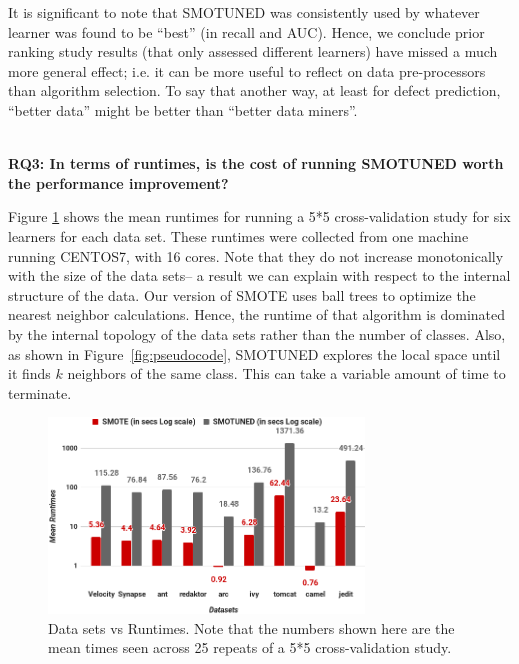 \documentclass[sigconf]{acmart}
\theoremstyle{break}
\newcommand{\sma}{{\sc SMOTE}}
\newcommand{\smb}{{\sc SMOTUNED}}
\begin{document}
It is significant to note that
  {\smb} was  consistently  used  by  whatever  learner  was  found  to  be ``best'' (in recall and AUC). 
Hence, we conclude   prior ranking study results (that only assessed different learners) have missed a much more general effect; i.e.  
it can be more useful to reflect on data pre-processors than algorithm selection.
To say that another way, at least for defect prediction,
``better data'' might be better than ``better data miners''.

\noindent
{\bf \\RQ3: In  terms  of  runtimes,  is  the  cost  of  running  SMOTUNED worth the performance improvement?}

Figure \ref{runtime} shows the mean runtimes
for running a 5*5 cross-validation study for six learners for each data set.
These runtimes were collected from one machine running CENTOS7, with 16 cores.
Note that they do not increase monotonically with the size of the data sets--  a result we can explain with respect to the internal
structure of the data.
Our version of {\sma} uses ball trees to optimize the nearest neighbor calculations. Hence, the runtime of that algorithm is dominated by the internal topology of the data sets rather than the number of classes.
Also, as shown in 
Figure~\ref{fig:pseudocode},
{\smb} explores the local space until it finds $k$ neighbors of the same class. This can take a variable amount of time to terminate.

 \begin{figure}[!htbp]
  \centering
\includegraphics[width=3.3in,keepaspectratio]{./fig/runtimes.png}
\vspace{-0.3cm}
  \caption{Data sets vs Runtimes. Note that the numbers
  shown here are the mean times seen across 25 repeats of a 5*5 cross-validation study.
  }
  \label{runtime}
  \vspace{-0.4cm}
\end{figure}
\end{document}

